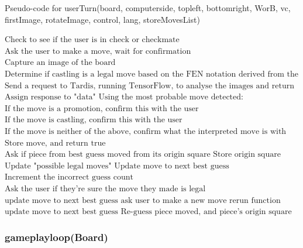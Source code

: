 \documentclass[onecolumn]{IEEEtran}
\begin{document}
\begin{algorithm}[H]
\caption{Pseudo-code for userTurn(board, computerside, topleft, bottomright, WorB, vc, firstImage, rotateImage, control, lang, storeMovesList)}
\begin{algorithmic}[1]
\STATE $\text{Check to see if the user is in check or checkmate}$
\STATE $\text{Ask the user to make a move, wait for confirmation}$
\STATE $\text{Capture an image of the board}$
\STATE $\text{Determine if castling is a legal move based on the FEN notation derived from the "board" input}$
\STATE $\text{Send a request to Tardis, running TensorFlow, to analyse the images and return expected moves}$
\STATE $\text{Assign response to "data"}$
\STATE $\text{Using the most probable move detected:}$
\STATE $\text{If the move is a promotion, confirm this with the user}$
\STATE $\text{If the move is castling, confirm this with the user}$
\STATE $\text{If the move is neither of the above, confirm what the interpreted move is with the user}$
	\STATE $\text{Store move, and return true}$
\ELSE
	\STATE $\text{Ask if piece from best guess moved from its origin square}$
			\STATE $\text{Store origin square}$
			\STATE $\text{Update "possible legal moves"}$
			\STATE $\text{Update move to next best guess}$
		\ELSE
			\STATE $\text{Increment the incorrect guess count}$
			\STATE $\text{Ask the user if they're sure the move they made is legal}$
				\STATE $\text{update move to next best guess}$
				\ELSE
				\STATE $\text{ask user to make a new move}$
				\STATE $\text{rerun function}$
				\ENDIF
			\ELSE
			\STATE $\text{update move to next best guess}$
			\STATE $\text{Re-guess piece moved, and piece's origin square}$
			\ENDIF
		\ENDIF
	\ENDIF
\ENDIF
\end{algorithmic}
\end{algorithm}


\subsubsection{gameplayloop(Board)}
\end{document}
